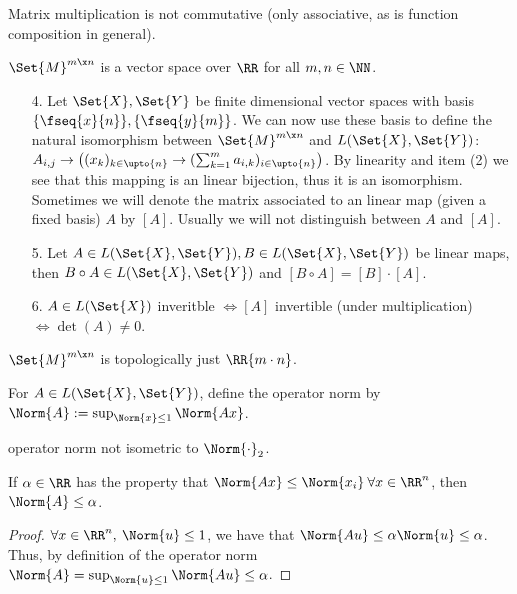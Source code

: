 \begin{rem}
 Matrix multiplication is not commutative (only associative, as is function composition in general).
\end{rem}
\begin{rem}
 $\Set{M}^{m\x n}$ is a vector space over $\RR$ for all $m,n\in\NN$.
\end{rem}
\begin{enumerate}
 \item[4.] Let $\Set{X}, \Set{Y}$ be finite dimensional vector spaces with basis $\{\fseq{x}{n}\}, \{\fseq{y}{m}\}$. We can now use these basis to define the natural isomorphism between $\Set{M}^{m\x n}$ and $L(\Set{X},\Set{Y})$: $A_{i,j}\to \left((x_k)_{k\in\upto{n}}\to (\sum_{k=1}^{m}a_{i,k})_{i\in\upto{n}}\right)$. By linearity and item (2) we see that this mapping is an linear bijection, thus it is an isomorphism. 
 Sometimes we will denote the matrix associated to an linear map (given a fixed basis) $A$ by $[A]$. Usually we will not distinguish between $A$ and $[A]$. 
 \item[5.] Let $A\in L(\Set{X},\Set{Y}), B\in L(\Set{X},\Set{Y})$ be linear maps, then $B\circ A\in L(\Set{X},\Set{Y})$ and $[B\circ A]=[B]\cdot[A]$.
 \item[6.] $A\in L(\Set{X})$ inveritble $\Leftrightarrow [A]$ invertible (under multiplication) $\Leftrightarrow\det(A)\neq 0$. 
\end{enumerate}
\begin{rem}
	$\Set{M}^{m\x n}$ is topologically just $\RR{m\cdot n}$. 
\end{rem}
\begin{defn}
 For $A\in L(\Set{X},\Set{Y})$, define the operator norm by $\Norm{A}:=\sup_{\Norm{x}\leq 1}\Norm{A x}$.
\end{defn}
\begin{rem}
 operator norm not isometric to $\Norm{\cdot}_2$.
\end{rem}
\begin{lem}
 \label{lem:obvbndOpNorm}
 If $\alpha\in\RR$ has the property that $\Norm{A x}\leq \Norm{x_i}\:\forall x\in\RR^n$, then $\Norm{A}\leq \alpha$.
\end{lem}
\begin{proof}
 $\forall x\in\RR^n,\:\Norm{u}\leq 1$, we have that $\Norm{Au}\leq \alpha\Norm{u}\leq\alpha$. Thus, by definition of the operator norm $\Norm{A}=\sup_{\Norm{u}\leq 1}\Norm{Au}\leq \alpha$.
\end{proof}
